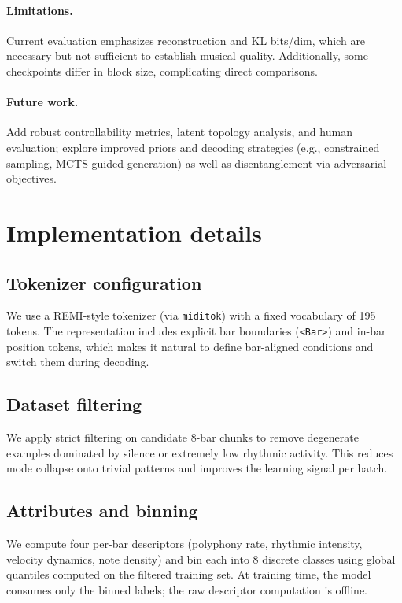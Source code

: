 \documentclass[10pt]{article}
\newcommand{\Bar}{\texttt{<Bar>}}
\begin{document}
\paragraph{Limitations.}
Current evaluation emphasizes reconstruction and KL bits/dim, which are necessary but not sufficient to establish musical quality. Additionally, some checkpoints differ in block size, complicating direct comparisons.

\paragraph{Future work.}
Add robust controllability metrics, latent topology analysis, and human evaluation; explore improved priors and decoding strategies (e.g., constrained sampling, MCTS-guided generation) as well as disentanglement via adversarial objectives.

\clearpage
\appendix
\section{Implementation details}
\subsection{Tokenizer configuration}
We use a REMI-style tokenizer (via \texttt{miditok}) with a fixed vocabulary of 195 tokens. The representation includes explicit bar boundaries (\Bar) and in-bar position tokens, which makes it natural to define bar-aligned conditions and switch them during decoding.

\subsection{Dataset filtering}
We apply strict filtering on candidate 8-bar chunks to remove degenerate examples dominated by silence or extremely low rhythmic activity. This reduces mode collapse onto trivial patterns and improves the learning signal per batch.

\subsection{Attributes and binning}
We compute four per-bar descriptors (polyphony rate, rhythmic intensity, velocity dynamics, note density) and bin each into 8 discrete classes using global quantiles computed on the filtered training set. At training time, the model consumes only the binned labels; the raw descriptor computation is offline.
\end{document}

